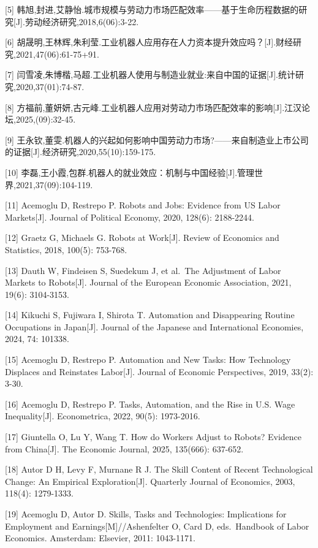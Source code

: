 \documentclass[UTF8, zihao=-4, a4paper, openany, fontset=none]{ctexrep}
\numberwithin{equation}{chapter}
\begin{document}
{[}5{]} 韩旭,封进,艾静怡.城市规模与劳动力市场匹配效率------基于生命历程数据的研究{[}J{]}.劳动经济研究,2018,6(06):3-22.

{[}6{]} 胡晟明,王林辉,朱利莹.工业机器人应用存在人力资本提升效应吗？{[}J{]}.财经研究,2021,47(06):61-75+91.

{[}7{]} 闫雪凌,朱博楷,马超.工业机器人使用与制造业就业:来自中国的证据{[}J{]}.统计研究,2020,37(01):74-87.

{[}8{]} 方福前,董妍妍,古元峰.工业机器人应用对劳动力市场匹配效率的影响{[}J{]}.江汉论坛,2025,(09):32-45.

{[}9{]} 王永钦,董雯.机器人的兴起如何影响中国劳动力市场?------来自制造业上市公司的证据{[}J{]}.经济研究,2020,55(10):159-175.

{[}10{]} 李磊,王小霞,包群.机器人的就业效应：机制与中国经验{[}J{]}.管理世界,2021,37(09):104-119.

{[}11{]} Acemoglu D, Restrepo P. Robots and Jobs: Evidence from US Labor Markets{[}J{]}. Journal of Political Economy, 2020, 128(6): 2188-2244.

{[}12{]} Graetz G, Michaels G. Robots at Work{[}J{]}. Review of Economics and Statistics, 2018, 100(5): 753-768.

{[}13{]} Dauth W, Findeisen S, Suedekum J, et al.~The Adjustment of Labor Markets to Robots{[}J{]}. Journal of the European Economic Association, 2021, 19(6): 3104-3153.

{[}14{]} Kikuchi S, Fujiwara I, Shirota T. Automation and Disappearing Routine Occupations in Japan{[}J{]}. Journal of the Japanese and International Economies, 2024, 74: 101338.

{[}15{]} Acemoglu D, Restrepo P. Automation and New Tasks: How Technology Displaces and Reinstates Labor{[}J{]}. Journal of Economic Perspectives, 2019, 33(2): 3-30.

{[}16{]} Acemoglu D, Restrepo P. Tasks, Automation, and the Rise in U.S. Wage Inequality{[}J{]}. Econometrica, 2022, 90(5): 1973-2016.

{[}17{]} Giuntella O, Lu Y, Wang T. How do Workers Adjust to Robots? Evidence from China{[}J{]}. The Economic Journal, 2025, 135(666): 637-652.

{[}18{]} Autor D H, Levy F, Murnane R J. The Skill Content of Recent Technological Change: An Empirical Exploration{[}J{]}. Quarterly Journal of Economics, 2003, 118(4): 1279-1333.

{[}19{]} Acemoglu D, Autor D. Skills, Tasks and Technologies: Implications for Employment and Earnings{[}M{]}//Ashenfelter O, Card D, eds.~Handbook of Labor Economics. Amsterdam: Elsevier, 2011: 1043-1171.
\end{document}

